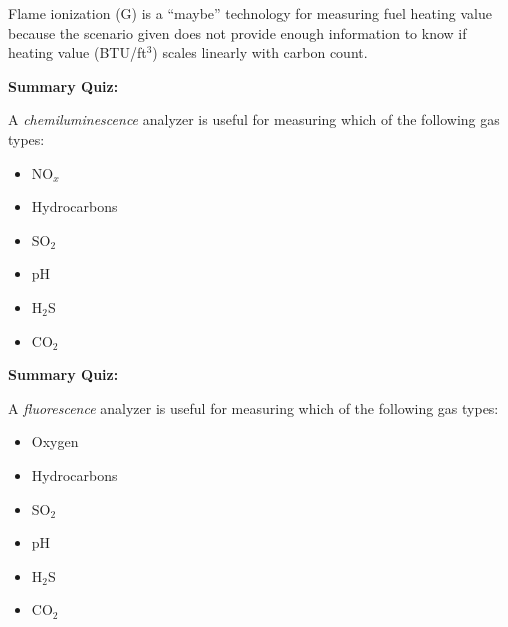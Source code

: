





Flame ionization (G) is a ``maybe'' technology for measuring fuel heating value because the scenario given does not provide enough information to know if heating value (BTU/ft$^{3}$) scales linearly with carbon count.






\vfil \eject

\noindent
{\bf Summary Quiz:}

A {\it chemiluminescence} analyzer is useful for measuring which of the following gas types:

\begin{itemize}
\item{} NO$_{x}$
\vskip 5pt 
\item{} Hydrocarbons
\vskip 5pt 
\item{} SO$_{2}$
\vskip 5pt 
\item{} pH
\vskip 5pt 
\item{} H$_{2}$S
\vskip 5pt 
\item{} CO$_{2}$
\end{itemize}





\vfil \eject

\noindent
{\bf Summary Quiz:}

A {\it fluorescence} analyzer is useful for measuring which of the following gas types:

\begin{itemize}
\item{} Oxygen
\vskip 5pt 
\item{} Hydrocarbons
\vskip 5pt 
\item{} SO$_{2}$
\vskip 5pt 
\item{} pH
\vskip 5pt 
\item{} H$_{2}$S
\vskip 5pt 
\item{} CO$_{2}$
\end{itemize}





